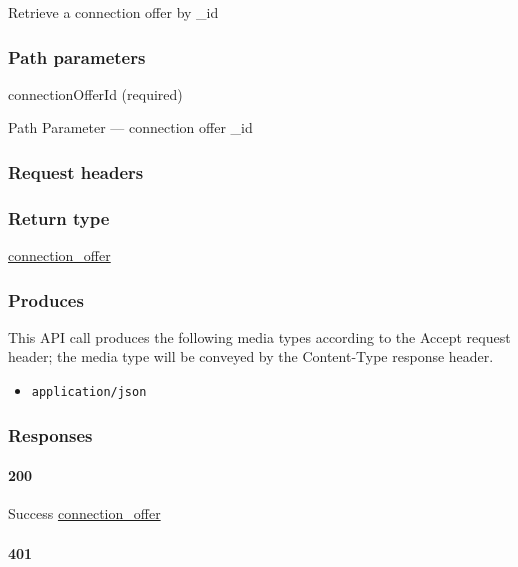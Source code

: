 Retrieve a connection offer by \_id

\hypertarget{path-parameters-1}{%
\subsubsection{Path parameters}\label{path-parameters-1}}

connectionOfferId (required)

{Path Parameter} --- connection offer \_id

\hypertarget{request-headers-1}{%
\subsubsection{Request headers}\label{request-headers-1}}

\hypertarget{return-type}{%
\subsubsection{Return type}\label{return-type}}

\protect\hyperlink{connection_offer}{connection\_offer}

\hypertarget{produces-1}{%
\subsubsection{Produces}\label{produces-1}}

This API call produces the following media types according to the
{Accept} request header; the media type will be conveyed by the
{Content-Type} response header.

\begin{itemize}
\tightlist
\item
  \texttt{application/json}
\end{itemize}

\hypertarget{responses-1}{%
\subsubsection{Responses}\label{responses-1}}

\hypertarget{section-3}{%
\paragraph{200}\label{section-3}}

Success \protect\hyperlink{connection_offer}{connection\_offer}

\hypertarget{section-4}{%
\paragraph{401}\label{section-4}}

